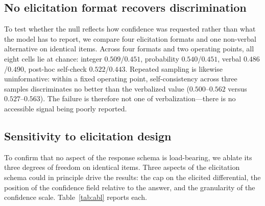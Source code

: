 \documentclass[journal,twoside]{IEEEtran}
\begin{document}
\begin{table}[!htb]
\caption{Three estimators on identical committed answers, AUROC with $95\%$ bootstrap interval,
$n=250$ per cell. $\Delta$ is the paired contrast against the verbalized value at the frontier.}
\label{tab:baselines}
\centering
\small
{}
\end{table}

\subsection{No elicitation format recovers discrimination}
To test whether the null reflects how confidence was requested rather than what the model has to
report, we compare four elicitation formats and one non-verbal alternative on identical items.
Across four formats and two operating points, all eight cells lie at chance: integer
$0.509$/$0.451$, probability $0.540$/$0.451$, verbal $0.486$/$0.490$, post-hoc self-check
$0.522$/$0.443$. Repeated sampling is likewise uninformative: within a fixed operating point,
self-consistency across three samples discriminates no better than the verbalized value
($0.500$--$0.562$ versus $0.527$--$0.563$). The failure is therefore not one of verbalization---there
is no accessible signal being poorly reported.


\subsection{Sensitivity to elicitation design}
To confirm that no aspect of the response schema is load-bearing, we ablate its three degrees of
freedom on identical items. Three aspects of the elicitation schema could in principle drive the results: the cap on the
elicited differential, the position of the confidence field relative to the answer, and the
granularity of the confidence scale. Table~\ref{tab:abl} reports each.
\end{document}
